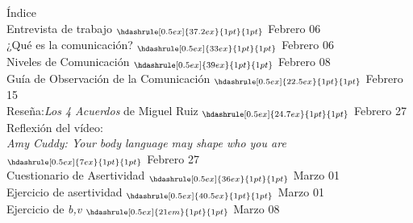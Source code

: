 \documentclass[a4paper,12pt]{article}
\begin{document}
{\LARGE Índice}\\[8ex]
Entrevista de trabajo $_{\hdashrule[0.5ex]{37.2ex}{1pt}{1pt}}$ {\small Febrero 06}\\[1ex] 
¿Qué es la comunicación? $_{\hdashrule[0.5ex]{33ex}{1pt}{1pt}}$ \small{Febrero 06}\\[1ex]
Niveles de Comunicación $_{\hdashrule[0.5ex]{39ex}{1pt}{1pt}}$ \small{Febrero 08}\\[1ex]
Guía de Observación de la Comunicación $_{\hdashrule[0.5ex]{22.5ex}{1pt}{1pt}}$ {\small Febrero 15}\\[1ex]
Reseña:\textit{Los 4 Acuerdos} de Miguel Ruiz $_{\hdashrule[0.5ex]{24.7ex}{1pt}{1pt}}$ \small{Febrero 27}\\[1ex]
Reflexión del vídeo:\\ \textit{Amy Cuddy: Your body language may shape who you are} $_{\hdashrule[0.5ex]{7ex}{1pt}{1pt}}$ \small{Febrero 27}\\[1ex]
Cuestionario de Asertividad $_{\hdashrule[0.5ex]{36ex}{1pt}{1pt}}$ \small{Marzo 01}\\[1ex]
Ejercicio de asertividad $_{\hdashrule[0.5ex]{40.5ex}{1pt}{1pt}}$ \small{Marzo 01}\\[1ex]
Ejercicio de \textit{b,v} $_{\hdashrule[0.5ex]{21em}{1pt}{1pt}}$ \small{Marzo 08}\\[1ex]
\end{document}
